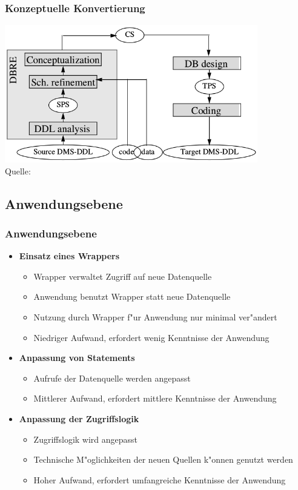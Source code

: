 \documentclass{beamer}
\begin{document}
	\begin{frame}
		\frametitle{Konzeptuelle Konvertierung}
		
		\centering
		\includegraphics[height = 6cm]{../images/strategies_fig_02b.png}\\
		\tiny Quelle: \cite{henrard-2002}
	\end{frame}
	
	\subsection{Anwendungsebene}
	
	\begin{frame}
		\frametitle{Anwendungsebene}
		
		\begin{itemize}
			\item \textbf{Einsatz eines Wrappers} 
				\begin{itemize}
					\item Wrapper verwaltet Zugriff auf neue Datenquelle
					\item Anwendung benutzt Wrapper statt neue Datenquelle
					\item Nutzung durch Wrapper f"ur Anwendung nur minimal ver"andert
					\item Niedriger Aufwand, erfordert wenig Kenntnisse der Anwendung
				\end{itemize}
			\item \textbf{Anpassung von Statements} 
				\begin{itemize}
					\item Aufrufe der Datenquelle werden angepasst
					\item Mittlerer Aufwand, erfordert mittlere Kenntnisse der Anwendung
				\end{itemize}
			\item \textbf{Anpassung der Zugriffslogik}
				\begin{itemize}
					\item Zugriffslogik wird angepasst
					\item Technische M"oglichkeiten der neuen Quellen k"onnen genutzt werden
					\item Hoher Aufwand, erfordert umfangreiche Kenntnisse der Anwendung
				\end{itemize}
		\end{itemize}
	\end{frame}
	
\end{document}
